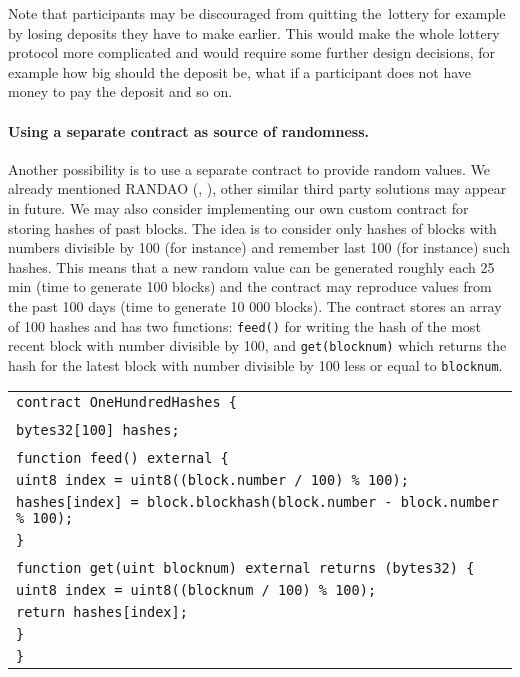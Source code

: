 \documentclass[a4paper]{article}
\begin{document}
    Note that participants may be discouraged from quitting the~lottery for example by losing deposits they have to
    make earlier. This would make the whole lottery protocol more complicated and would require some further design
    decisions, for example how big should the deposit be, what if a participant does not have money to pay the deposit
    and so on.

    \paragraph{Using a separate contract as source of randomness.}
    Another possibility is to use a separate contract to provide random values. We already mentioned RANDAO
    (\cite{RANDAO}, \cite{RANDAO2}), other similar third party solutions may appear in future.
    We may also consider implementing our own custom contract for storing hashes of past blocks.
    The idea is to consider only hashes of blocks with numbers divisible by 100 (for instance) and remember last 100
    (for instance) such hashes. This means that a new random value can be generated roughly each 25 min
    (time to generate 100 blocks) and the contract may reproduce values from the past 100 days
    (time to generate 10 000 blocks). The contract stores an array of 100 hashes and has two functions:
    \texttt{feed()} for writing the hash of the most recent block with number divisible by 100, and
    \texttt{get(blocknum)} which returns the hash for the latest block with number divisible by 100 less or
    equal to \texttt{blocknum}.

    \label{sec:hundred}

    \begin{tabular}{l}
        \texttt{contract OneHundredHashes \{}\\
        \\
	    \qquad \texttt{bytes32[100] hashes;}\\
        \\
	    \qquad\texttt{function feed() external \{}\\
    	\qquad\qquad \texttt{uint8 index = uint8((block.number / 100) \% 100);}\\
    	\qquad\qquad \texttt{hashes[index] = block.blockhash(block.number - block.number \% 100);}\\
	    \qquad\texttt{\}}\\
        \\
	    \qquad \texttt{function get(uint blocknum) external returns (bytes32) \{}\\
        \qquad\qquad \texttt{uint8 index = uint8((blocknum / 100) \% 100);}\\
    	\qquad\qquad \texttt{return hashes[index];}\\
	    \qquad\texttt{\}}\\
    \texttt{\}}
    \end{tabular}
\end{document}
